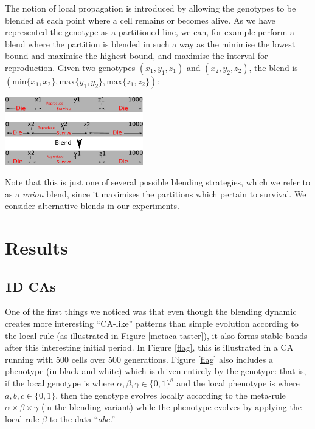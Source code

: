 \documentclass{AISB2008}
\makeatletter
\renewcommand{\boxed}[1]{\text{\fboxsep=.2em\fbox{\m@th$\displaystyle#1$}}}
\newcommand{\mystrut}{\vphantom{b\gamma}}
\makeatother
\begin{document}
The notion of local propagation is introduced by allowing the
genotypes to be blended at each point where a cell remains or becomes
alive.  As we have represented the genotype as a partitioned line, we
can, for example perform a blend where the partition is blended in
such a way as the minimise the lowest bound and maximise the highest
bound, and maximise the interval for reproduction.  Given two
genotypes $(x_1, y_1, z_1)$ and $(x_2, y_2, z_2)$, the blend is
$(\mathrm{min} \{x_1,x_2\}, \mathrm{max} \{y_1,y_2\}, \mathrm{max}
\{z_1,z_2\})$:
\begin{center}
\includegraphics[width=0.45\textwidth]{2dgenotypeblend.pdf}
\end{center}

Note that this is just one of several possible blending strategies,
which we refer to as a {\em union} blend, since it maximises the
partitions which pertain to survival.  We consider alternative blends
in our experiments.



\section{Results}
\subsection{1D CAs} \label{1d-results}

One of the first things we noticed was that even though the blending
dynamic creates more interesting ``CA-like'' patterns than simple
evolution according to the local rule (as illustrated in Figure
\ref{metaca-taster}), it also forms stable bands after this
interesting initial period.  In Figure \ref{flag}, this is illustrated
in a CA running with 500 cells over 500 generations.  Figure
\ref{flag} also includes a phenotype (in black and white) which is
driven entirely by the genotype: that is, if the local genotype is
\boxed{\alpha\mystrut}\boxed{\beta\mystrut}\boxed{\gamma\mystrut} 
where $\alpha, \beta, \gamma \in \{0,1\}^8$
and the local phenotype is
%
\boxed{a\mystrut}\boxed{b\mystrut}\boxed{c\mystrut}
where $a, b, c \in \{0,1\}$,
%
then the genotype evolves locally according to the meta-rule $\alpha
\times \beta \times \gamma$ (in the blending variant) while the
phenotype evolves by applying the local rule $\beta$ to the data
``$abc$.''
\end{document}
